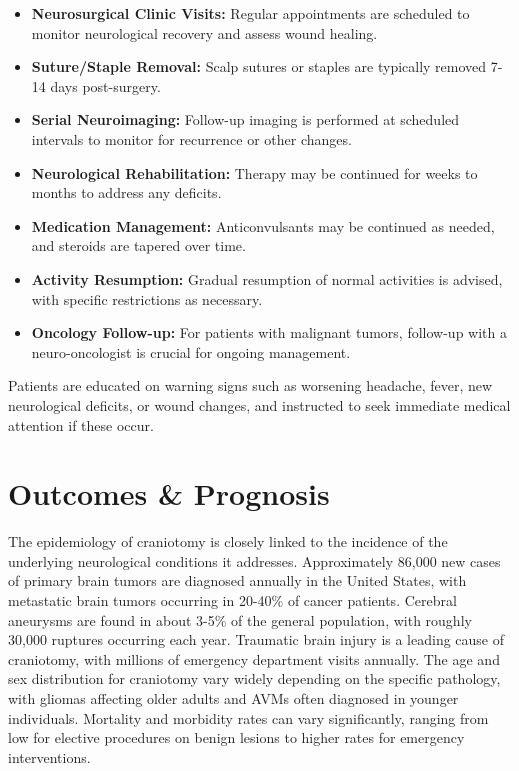 \begin{itemize}
  \item \textbf{Neurosurgical Clinic Visits:} Regular appointments are scheduled to monitor neurological recovery and assess wound healing.
  
  \item \textbf{Suture/Staple Removal:} Scalp sutures or staples are typically removed 7-14 days post-surgery.
  
  \item \textbf{Serial Neuroimaging:} Follow-up imaging is performed at scheduled intervals to monitor for recurrence or other changes.
  
  \item \textbf{Neurological Rehabilitation:} Therapy may be continued for weeks to months to address any deficits.
  
  \item \textbf{Medication Management:} Anticonvulsants may be continued as needed, and steroids are tapered over time.
  
  \item \textbf{Activity Resumption:} Gradual resumption of normal activities is advised, with specific restrictions as necessary.
  
  \item \textbf{Oncology Follow-up:} For patients with malignant tumors, follow-up with a neuro-oncologist is crucial for ongoing management.
\end{itemize}

Patients are educated on warning signs such as worsening headache, fever, new neurological deficits, or wound changes, and instructed to seek immediate medical attention if these occur.

\section*{Outcomes \& Prognosis}
The epidemiology of craniotomy is closely linked to the incidence of the underlying neurological conditions it addresses. Approximately 86,000 new cases of primary brain tumors are diagnosed annually in the United States, with metastatic brain tumors occurring in 20-40\% of cancer patients. Cerebral aneurysms are found in about 3-5\% of the general population, with roughly 30,000 ruptures occurring each year. Traumatic brain injury is a leading cause of craniotomy, with millions of emergency department visits annually. The age and sex distribution for craniotomy vary widely depending on the specific pathology, with gliomas affecting older adults and AVMs often diagnosed in younger individuals. Mortality and morbidity rates can vary significantly, ranging from low for elective procedures on benign lesions to higher rates for emergency interventions.


